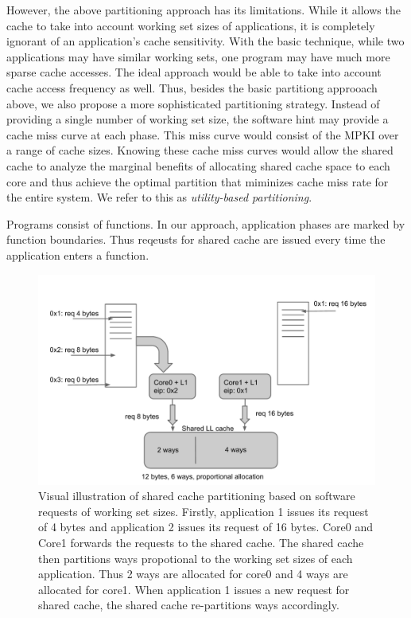 \documentclass{acm_proc_article-sp}
\begin{document}
However, the above partitioning approach has its limitations. While it allows the
cache to take into account working set sizes of applications, it is completely ignorant
of an application's cache sensitivity. With the basic technique, while two applications
may have similar working sets, one program may have much more sparse cache accesses.
The ideal approach would be able to take into account cache access frequency as well. 
Thus, besides the basic partitiong approoach above, we also propose a more 
sophisticated partitioning strategy. Instead of providing a single number of 
working set size, the software hint may provide a cache miss curve at each 
phase. This miss curve would consist of the MPKI over a range of cache sizes. 
Knowing these cache miss curves would allow the shared cache to analyze the 
marginal benefits of allocating shared cache space to each core and thus achieve
the optimal partition that miminizes cache miss rate for the entire system. We refer to this as 
\emph{utility-based partitioning}.

Programs consist of functions. In our approach, application phases are marked by
function boundaries. Thus reqeusts for shared cache are issued every time the 
application enters a function.

\begin{figure}[th!]
  \label{fig:hinted_partition}
  \centering
  \includegraphics[width=.5\textwidth]{figs/hinted_partition.pdf}
  \caption{\small Visual illustration of shared cache partitioning based on software 
    requests of working set sizes. Firstly, application 1 issues its request 
    of 4 bytes and application 2 issues its request of 16 bytes. Core0 and Core1 
  forwards the requests to the shared cache. The shared cache then partitions 
  ways propotional to the working set sizes of each application. Thus 2 ways are 
  allocated for core0 and 4 ways are allocated for core1. When application 1 issues
  a new request for shared cache, the shared cache re-partitions ways 
  accordingly.}
\end{figure}
\end{document}
